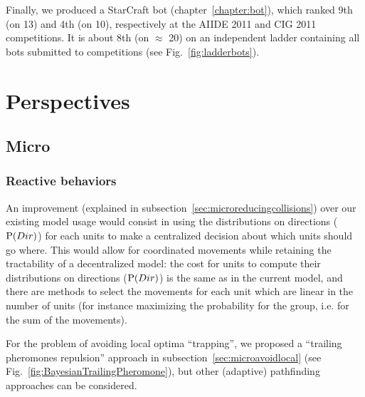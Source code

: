 Finally, we produced a StarCraft bot (chapter~\ref{chapter:bot}), which ranked 9th (on 13) and 4th (on 10), respectively at the AIIDE 2011 and CIG 2011 competitions. It is about 8th (on $\approx$ 20) on an independent ladder containing all bots submitted to competitions (see Fig.~\ref{fig:ladderbots}).



\section{Perspectives}
\label{chapter:perspectives}
\subsection{Micro}
\subsubsection{Reactive behaviors}
An improvement (explained in subsection~\ref{sec:microreducingcollisions}) over our existing model usage would consist in using the distributions on directions ($\mathrm{P}(Dir)$) for each units to make a centralized decision about which units should go where. This would allow for coordinated movements while retaining the tractability of a decentralized model: the cost for units to compute their distributions on directions ($\mathrm{P}(Dir)$) is the same as in the current model, and there are methods to select the movements for each unit which are linear in the number of units (for instance maximizing the probability for the group, i.e. for the sum of the movements).

For the problem of avoiding local optima ``trapping'', we proposed a ``trailing pheromones repulsion'' approach in subsection~\ref{sec:microavoidlocal} (see Fig.~\ref{fig:BayesianTrailingPheromone}), but other (adaptive) pathfinding approaches can be considered.

